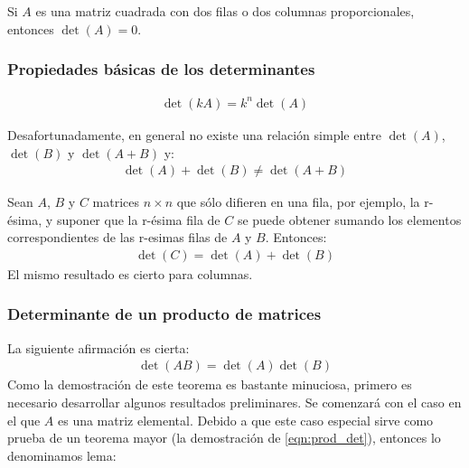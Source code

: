 \documentclass[a4paper,12pt]{article}
\begin{document}
\begin{theorem}
  Si $A$ es una matriz cuadrada con dos filas o dos columnas proporcionales,
  entonces $\det(A)=0$.
  \label{theo:deter_matr_propor}
\end{theorem}

\subsubsection{Propiedades básicas de los determinantes}

\begin{concept}
  \begin{align*}
    \det(kA)=k^n\det(A)
  \end{align*}
\end{concept}

Desafortunadamente, en general no existe una relación simple entre
$\det(A)$, $\det(B)$ y $\det(A+B)$ y:
\begin{align*}
  \det(A) + \det(B) \ne \det(A+B)
\end{align*}

\begin{theorem}
  Sean $A$, $B$ y $C$ matrices $n\times n$ que sólo difieren en una fila, por
  ejemplo, la r-ésima, y suponer que la r-ésima fila de $C$ se puede obtener
  sumando los elementos correspondientes de las r-esimas filas de $A$ y
  $B$. Entonces:
  \begin{align*}
    \det(C)=\det(A)+\det(B)
  \end{align*}
  El mismo resultado es cierto para columnas.
  \label{theo:det_suma}
\end{theorem}

\subsubsection{Determinante de un producto de matrices}

La siguiente afirmación es cierta:
\begin{align}
  \det(AB)=\det(A)\det(B)
  \label{eqn:prod_det}
\end{align}
Como la demostración de este teorema es bastante minuciosa, primero es
necesario desarrollar algunos resultados preliminares. Se comenzará con el
caso en el que $A$ es una matriz elemental. Debido a que este caso especial
sirve como prueba de un teorema mayor (la demostración de
\eqref{eqn:prod_det}), entonces lo denominamos lema:
\end{document}
